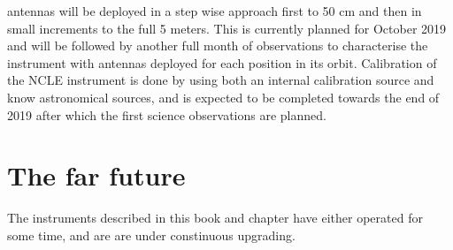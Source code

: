antennas will be deployed in a step wise approach first to 50 cm and then in small increments to the full 5 meters. This is currently planned for October 2019 and will be followed by another full month of observations to characterise the instrument with antennas deployed for each position in its orbit. Calibration of the NCLE instrument is done by using both an internal calibration source and know astronomical sources, and is expected to be completed towards the end of 2019 after which the first science observations are planned.

\section{The far future}

The instruments described in this book and chapter have either operated for some time, and are are under constinuous upgrading. 

